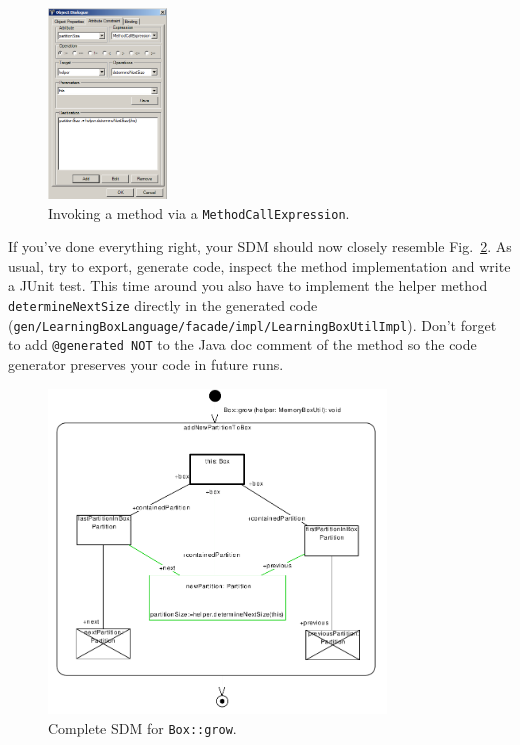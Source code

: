 \clearpage

\begin{figure}[htbp]
\begin{center}
  \includegraphics[width=0.28\textwidth]{pics/sdmBilder/grow/sdm66}
  \caption{Invoking a method via a \texttt{MethodCallExpression}.}  
  \label{fig:sdm_grow_4}
\end{center}
\end{figure}

If you've done everything right, your SDM should now closely resemble
Fig.~\ref{fig:sdm_grow_5}.  As usual, try to export, generate code, inspect the
method implementation and write a JUnit test.  This time around you also have to
implement the helper method \texttt{determineNextSize} directly in the
generated code
(\texttt{gen/\-LearningBoxLanguage/\-facade/\-impl/\-LearningBoxUtilImpl}).
Don't forget to add \texttt{@generated NOT} to the Java doc comment of the
method so the code generator preserves your code in future runs.

\begin{figure}[htbp]
\begin{center}
  \includegraphics[width=0.8\textwidth]{pics/sdmBilder/grow/sdm67}
  \caption{Complete SDM for \texttt{Box::grow}.}  
  \label{fig:sdm_grow_5}
\end{center}
\end{figure}

